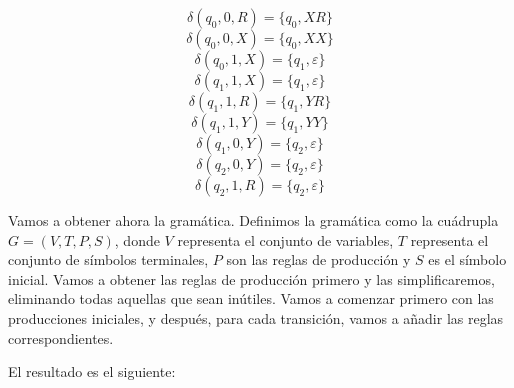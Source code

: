 \documentclass[11pt,a4paper]{article}
\begin{document}
		\[\delta(q_0, 0, R) = \{ q_0, XR \}\]
		\[\delta(q_0, 0, X) = \{ q_0, XX \}\]
		\[\delta(q_0, 1, X) = \{ q_1, \varepsilon\}\]
		\[\delta(q_1, 1, X) = \{ q_1, \varepsilon\}\]
		\[\delta(q_1, 1, R) = \{ q_1, YR\}\]
		\[\delta(q_1, 1, Y) = \{ q_1, YY\}\]
		\[\delta(q_1, 0, Y) = \{ q_2, \varepsilon\}\]
		\[\delta(q_2, 0, Y) = \{ q_2, \varepsilon\}\]
		\[\delta(q_2, 1, R) = \{ q_2, \varepsilon\}\]
		
		Vamos a obtener ahora la gramática. Definimos la gramática como la cuádrupla $G = (V, T, P, S)$, donde $V$ representa
		el conjunto de variables, $T$ representa el conjunto de símbolos terminales, $P$ son las reglas de producción
		y $S$ es el símbolo inicial. Vamos a obtener las reglas de producción primero y las simplificaremos, eliminando
		todas aquellas que sean inútiles. Vamos a comenzar primero con las producciones iniciales, y después, para cada
		transición, vamos a añadir las reglas correspondientes. \par 
		
		El resultado es el siguiente:
		
\end{document}
